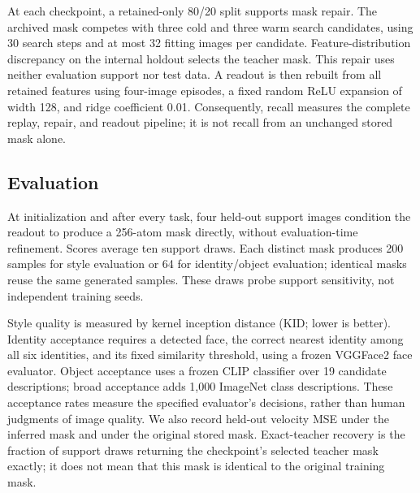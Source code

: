 At each checkpoint, a retained-only 80/20 split supports mask repair. The archived mask competes with three cold and three warm search candidates, using 30 search steps and at most 32 fitting images per candidate. Feature-distribution discrepancy on the internal holdout selects the teacher mask. This repair uses neither evaluation support nor test data. A readout is then rebuilt from all retained features using four-image episodes, a fixed random ReLU expansion of width 128, and ridge coefficient 0.01. Consequently, recall measures the complete replay, repair, and readout pipeline; it is not recall from an unchanged stored mask alone.

\subsection{Evaluation}
At initialization and after every task, four held-out support images condition the readout to produce a 256-atom mask directly, without evaluation-time refinement. Scores average ten support draws. Each distinct mask produces 200 samples for style evaluation or 64 for identity/object evaluation; identical masks reuse the same generated samples. These draws probe support sensitivity, not independent training seeds.

Style quality is measured by kernel inception distance (KID; lower is better). Identity acceptance requires a detected face, the correct nearest identity among all six identities, and its fixed similarity threshold, using a frozen VGGFace2 face evaluator. Object acceptance uses a frozen CLIP classifier over 19 candidate descriptions; broad acceptance adds 1,000 ImageNet class descriptions. These acceptance rates measure the specified evaluator's decisions, rather than human judgments of image quality. We also record held-out velocity MSE under the inferred mask and under the original stored mask. Exact-teacher recovery is the fraction of support draws returning the checkpoint's selected teacher mask exactly; it does not mean that this mask is identical to the original training mask.

